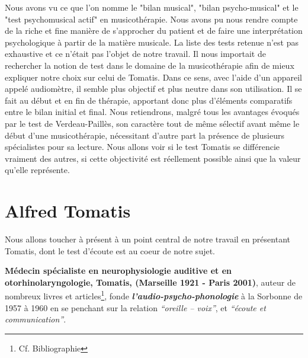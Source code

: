 Nous avons vu ce que l'on nomme le "bilan musical", "bilan psycho-musical" et le  "test psychomusical 
actif" en musicothérapie. Nous avons pu nous rendre compte de la riche et fine manière de s'approcher 
du patient et de faire  une interprétation psychologique à partir de la matière musicale.
%
La liste des tests retenue n'est pas exhaustive et ce n'était pas l'objet de notre travail.
Il nous importait de rechercher la notion de test dans le domaine de la musicothérapie afin de mieux 
expliquer notre choix sur celui de  Tomatis. Dans ce sens, avec 
l'aide d'un 
appareil appelé audiomètre, il
semble plus objectif et plus neutre dans son utilisation. Il se 
fait au début et en fin de thérapie, apportant donc plus 
d'éléments comparatifs  
entre le bilan initial et final. Nous retiendrons, malgré tous les avantages 
évoqués par le test de Verdeau-Paillès, son caractère tout de même sélectif avant même le début d'une 
musicothérapie, nécessitant d'autre part la présence de plusieurs spécialistes pour sa lecture.  
Nous allons voir si le test Tomatis se différencie vraiment des autres, si cette 
objectivité est réellement possible ainsi que  la valeur qu'elle représente.



\section {Alfred Tomatis }
Nous allons toucher à présent à un point central de notre travail en présentant
Tomatis, dont le test d'écoute est au coeur de notre sujet.


\textbf{Médecin spécialiste en neurophysiologie auditive et en
oto\-rhino\-la\-ryn\-go\-lo\-gie, Tomatis, (Marseille 1921 - Paris 2001)}, auteur de nombreux  livres et 
articles\footnote{Cf. Bibliographie}, fonde
\textit{\textbf{l'audio-psycho-phonologie}} à la Sorbonne de
1957 à 1960 en  se penchant sur la relation
\textit{``oreille -- voix''}, et \textit{``écoute
et communication''}.
